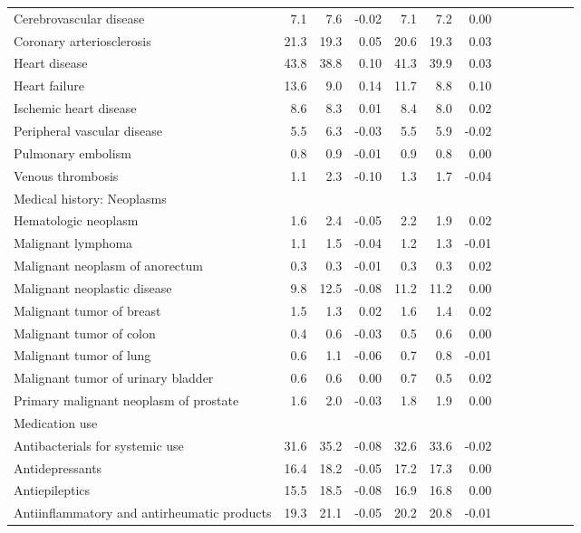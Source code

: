 \documentclass[11pt,]{article}
\begin{document}
\begin{longtable}{lrrrrrrrrrrrr}
      Cerebrovascular disease &  7.1 &  7.6 & -0.02 &  7.1 &  7.2 &  0.00 \\ 
      Coronary arteriosclerosis & 21.3 & 19.3 &  0.05 & 20.6 & 19.3 &  0.03 \\ 
      Heart disease & 43.8 & 38.8 &  0.10 & 41.3 & 39.9 &  0.03 \\ 
      Heart failure & 13.6 &  9.0 &  0.14 & 11.7 &  8.8 &  0.10 \\ 
      Ischemic heart disease &  8.6 &  8.3 &  0.01 &  8.4 &  8.0 &  0.02 \\ 
      Peripheral vascular disease &  5.5 &  6.3 & -0.03 &  5.5 &  5.9 & -0.02 \\ 
      Pulmonary embolism &  0.8 &  0.9 & -0.01 &  0.9 &  0.8 &  0.00 \\ 
      Venous thrombosis &  1.1 &  2.3 & -0.10 &  1.3 &  1.7 & -0.04 \\ 
  Medical history: Neoplasms &    &    &     &    &    &     \\ 
      Hematologic neoplasm &  1.6 &  2.4 & -0.05 &  2.2 &  1.9 &  0.02 \\ 
      Malignant lymphoma &  1.1 &  1.5 & -0.04 &  1.2 &  1.3 & -0.01 \\ 
      Malignant neoplasm of anorectum &  0.3 &  0.3 & -0.01 &  0.3 &  0.3 &  0.02 \\ 
      Malignant neoplastic disease &  9.8 & 12.5 & -0.08 & 11.2 & 11.2 &  0.00 \\ 
      Malignant tumor of breast &  1.5 &  1.3 &  0.02 &  1.6 &  1.4 &  0.02 \\ 
      Malignant tumor of colon &  0.4 &  0.6 & -0.03 &  0.5 &  0.6 &  0.00 \\ 
      Malignant tumor of lung &  0.6 &  1.1 & -0.06 &  0.7 &  0.8 & -0.01 \\ 
      Malignant tumor of urinary bladder &  0.6 &  0.6 &  0.00 &  0.7 &  0.5 &  0.02 \\ 
      Primary malignant neoplasm of prostate &  1.6 &  2.0 & -0.03 &  1.8 &  1.9 &  0.00 \\ 
  Medication use &    &    &     &    &    &     \\ 
      Antibacterials for systemic use & 31.6 & 35.2 & -0.08 & 32.6 & 33.6 & -0.02 \\ 
      Antidepressants & 16.4 & 18.2 & -0.05 & 17.2 & 17.3 &  0.00 \\ 
      Antiepileptics & 15.5 & 18.5 & -0.08 & 16.9 & 16.8 &  0.00 \\ 
      Antiinflammatory and antirheumatic products & 19.3 & 21.1 & -0.05 & 20.2 & 20.8 & -0.01 \\ 

\end{longtable}
\end{document}

